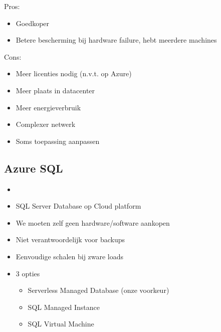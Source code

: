 \documentclass{article}
\begin{document}
Pros: 
\begin{itemize}
    \item Goedkoper
    \item Betere bescherming bij hardware failure, hebt meerdere machines
\end{itemize}

Cons:

\begin{itemize}
    \item Meer licenties nodig (n.v.t. op Azure)
    \item Meer plaats in datacenter
    \item Meer energieverbruik
    \item Complexer netwerk
    \item Soms toepassing aanpassen
\end{itemize}

\subsection{Azure SQL}

\begin{itemize}
    \item 
    \item SQL Server Database op Cloud platform
    \item We moeten zelf geen hardware/software aankopen
    \item Niet verantwoordelijk voor backups
    \item Eenvoudige schalen bij zware loads
    \item 3 opties
    \begin{itemize}
        \item Serverless Managed Database (onze voorkeur)
        \item SQL Managed Instance
        \item SQL Virtual Machine
    \end{itemize}
\end{itemize}
\end{document}

